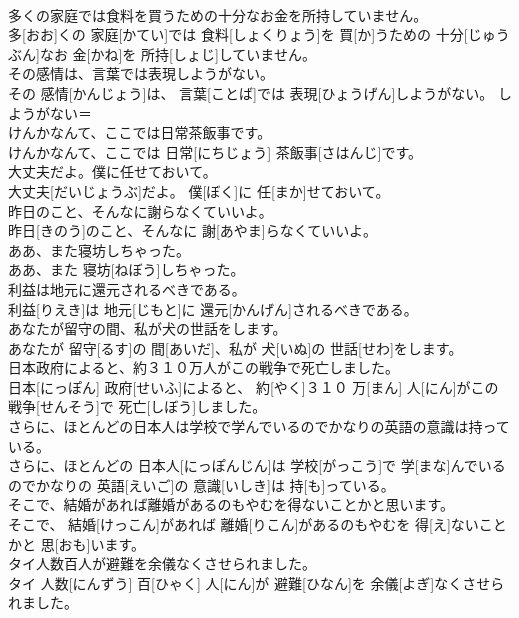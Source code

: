 \documentclass[8pt]{extreport}
\begin{document}
\begin{CJK}{UTF8}{min}
\\	多くの家庭では食料を買うための十分なお金を所持していません。	
\\	多[おお]くの 家庭[かてい]では 食料[しょくりょう]を 買[か]うための 十分[じゅうぶん]なお 金[かね]を 所持[しょじ]していません。	
\\	その感情は、言葉では表現しようがない。	
\\	その 感情[かんじょう]は、 言葉[ことば]では 表現[ひょうげん]しようがない。	しようがない＝ 
\\	けんかなんて、ここでは日常茶飯事です。	
\\	けんかなんて、ここでは 日常[にちじょう] 茶飯事[さはんじ]です。	
\\	大丈夫だよ。僕に任せておいて。	
\\	大丈夫[だいじょうぶ]だよ。 僕[ぼく]に 任[まか]せておいて。	
\\	昨日のこと、そんなに謝らなくていいよ。	
\\	昨日[きのう]のこと、そんなに 謝[あやま]らなくていいよ。	
\\	ああ、また寝坊しちゃった。	
\\	ああ、また 寝坊[ねぼう]しちゃった。	
\\	利益は地元に還元されるべきである。	
\\	利益[りえき]は 地元[じもと]に 還元[かんげん]されるべきである。	
\\	あなたが留守の間、私が犬の世話をします。	
\\	あなたが 留守[るす]の 間[あいだ]、私が 犬[いぬ]の 世話[せわ]をします。	
\\	日本政府によると、約３１０万人がこの戦争で死亡しました。	
\\	日本[にっぽん] 政府[せいふ]によると、 約[やく]３１０ 万[まん] 人[にん]がこの 戦争[せんそう]で 死亡[しぼう]しました。	
\\	さらに、ほとんどの日本人は学校で学んでいるのでかなりの英語の意識は持っている。	
\\	さらに、ほとんどの 日本人[にっぽんじん]は 学校[がっこう]で 学[まな]んでいるのでかなりの 英語[えいご]の 意識[いしき]は 持[も]っている。	
\\	そこで、結婚があれば離婚があるのもやむを得ないことかと思います。	
\\	そこで、 結婚[けっこん]があれば 離婚[りこん]があるのもやむを 得[え]ないことかと 思[おも]います。	
\\	タイ人数百人が避難を余儀なくさせられました。	
\\	タイ 人数[にんずう] 百[ひゃく] 人[にん]が 避難[ひなん]を 余儀[よぎ]なくさせられました。	

\end{CJK}
\end{document}
